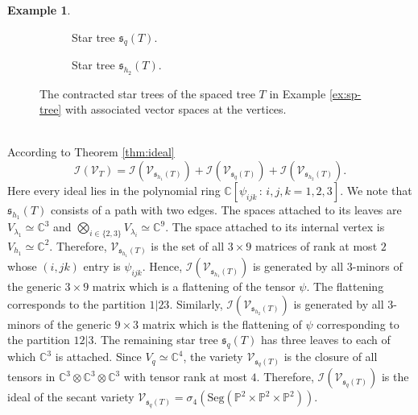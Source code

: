 \documentclass[12pt]{article}
\theoremstyle{definition}
\newtheorem{example}[theorem]{Example}
\numberwithin{theorem}{section}
\newcommand{\PP}{\mathbb{P}}
\newcommand{\CC}{\mathbb{C}}
\newcommand{\V}{\mathcal{V}}
\begin{document}
\begin{example}
\begin{figure}[htbp]
\begin{subfigure}[t]{0.30\textwidth}
\begin{tikzpicture}
\end{tikzpicture}
\caption{Star tree $\mathfrak{s}_{q}(T)$.}
\label{fig:Tq0}
\end{subfigure}
\hfill
\begin{subfigure}[t]{0.30\textwidth}
\centering
{}
\caption{Star tree $\mathfrak{s}_{h_2}(T)$.}
\label{fig:T_q11}
\end{subfigure}

\vspace{0.5em}

\caption{The contracted star trees of the spaced tree $T$ in Example \ref{ex:sp-tree} with associated vector spaces at the vertices.}
\label{fig:TTN_spaced_tree_combined}
\end{figure}
\\
According to Theorem \ref{thm:ideal} \cite{DK09}
$$ \mathcal{I}(\V_T) = \mathcal{I}(\V_{\mathfrak{s}_{h_1}(T)}) + \mathcal{I}(\V_{\mathfrak{s}_q(T)}) + \mathcal{I}(\V_{\mathfrak{s}_{h_2}(T)}).$$
Here every ideal lies in the polynomial ring $\CC[\psi_{ijk} \, : \, i,j,k=1,2,3]$.
We note that $\mathfrak{s}_{h_1}(T)$ consists of a path  with two edges. The spaces attached to its leaves are 
$V_{\lambda_1} \simeq \CC^3$ and $\bigotimes_{i\in\{2, 3\}}V_{\lambda_i} \simeq \CC^9 $. The space attached to its internal vertex is $V_{h_1} \simeq \CC^2$. Therefore, $\V_{\mathfrak{s}_{h_1}(T)}$ 
is the set of all $3 \times 9$ matrices of rank at most $2$ whose $(i,jk)$ entry is $\psi_{ijk}$.  
Hence, $\mathcal{I}(\V_{\mathfrak{s}_{h_1}(T)})$
is generated by all $3$-minors of the generic $3 \times 9$ matrix which is a flattening of the tensor $\psi$. The flattening corresponds to the partition $1|23$. Similarly, $\mathcal{I}(\V_{\mathfrak{s}_{h_2}(T)})$ is 
generated by all $3$-minors of the generic $9 \times 3$ matrix which is the flattening of $\psi$ corresponding to the partition $12|3$.  The remaining star tree $\mathfrak{s}_q(T)$ has three leaves to each of which $\CC^3$ is attached. Since $V_q \simeq \CC^4$, the variety $\V_{\mathfrak{s}_q(T)}$ is the closure of all tensors in $\CC^3 \otimes \CC^3 \otimes \CC^3$ with tensor rank at most $4$. Therefore, $\mathcal{I}(\V_{\mathfrak{s}_q(T)})$ is the ideal of the secant variety $\V_{\mathfrak{s}_q(T)} = \sigma_4(\mathrm{Seg}(\PP^2 \times \PP^2 \times \PP^2))$.
\end{example}
\end{document}
